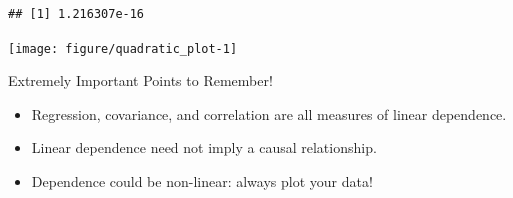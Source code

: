 %
%
\begin{frame}[fragile]
  \footnotesize
\begin{knitrout}
\color{fgcolor}\begin{kframe}
\begin{alltt}
 \hlkwb{<-} \hlstd{(} \hlstd{=} \hlopt{-}\hlstd{,}  \hlstd{=} \hlstd{,}  \hlstd{=} \hlstd{)}
 \hlkwb{<-} \hlopt{^}
\end{alltt}
\begin{verbatim}
## [1] 1.216307e-16
\end{verbatim}
\begin{alltt}
 \hlstd{(} \hlopt{~} 
\end{alltt}
\end{kframe}
\texttt{[image: figure/quadratic\_plot-1]} 

\end{knitrout}

\end{frame}
\begin{frame}{Extremely Important Points to Remember!}

  \begin{itemize}
    \item Regression, covariance, and correlation are all \alert{measures of linear dependence}. 
    \item Linear dependence \alert{need not} imply a causal relationship.
    \item Dependence could be non-linear: always plot your data!
  \end{itemize}


\end{frame}

